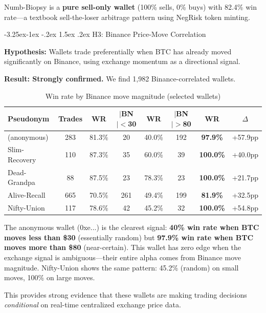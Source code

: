 \documentclass[11pt,a4paper]{article}
\makeatletter
\renewcommand\subsection{\@startsection{subsection}{2}{\z@}%
  {-3.25ex\@plus -1ex \@minus -.2ex}%
  {1.5ex \@plus .2ex}%
  {\normalfont\large\bfseries}}
\makeatother
\begin{document}
Numb-Biopsy is a \textbf{pure sell-only wallet} (100\% sells, 0\% buys) with 82.4\% win rate---a textbook sell-the-loser arbitrage pattern using NegRisk token minting.

\subsection{H3: Binance Price-Move Correlation}

\textbf{Hypothesis:} Wallets trade preferentially when BTC has already moved significantly on Binance, using exchange momentum as a directional signal.

\textbf{Result: Strongly confirmed.} We find 1,982 Binance-correlated wallets.

\begin{table}[H]
\centering
\caption{Win rate by Binance move magnitude (selected wallets)}
\label{tab:binance_corr}
\small
\begin{tabular}{@{}lccccccc@{}}
\toprule
\textbf{Pseudonym} & \textbf{Trades} & \textbf{WR} & \textbf{$|$BN$|<$30} & \textbf{WR} & \textbf{$|$BN$|>$80} & \textbf{WR} & \textbf{$\Delta$} \\
\midrule
(anonymous) & 283 & 81.3\% & 20 & 40.0\% & 192 & \textbf{97.9\%} & +57.9pp \\
Slim-Recovery & 110 & 87.3\% & 35 & 60.0\% & 39 & \textbf{100.0\%} & +40.0pp \\
Dead-Grandpa & 88 & 87.5\% & 23 & 78.3\% & 23 & \textbf{100.0\%} & +21.7pp \\
Alive-Recall & 665 & 70.5\% & 261 & 49.4\% & 199 & \textbf{81.9\%} & +32.5pp \\
Nifty-Union & 117 & 78.6\% & 42 & 45.2\% & 32 & \textbf{100.0\%} & +54.8pp \\
\bottomrule
\end{tabular}
\end{table}

The anonymous wallet (0xe...) is the clearest signal: \textbf{40\% win rate when BTC moves less than \$30} (essentially random) but \textbf{97.9\% win rate when BTC moves more than \$80} (near-certain). This wallet has zero edge when the exchange signal is ambiguous---their entire alpha comes from Binance move magnitude. Nifty-Union shows the same pattern: 45.2\% (random) on small moves, 100\% on large moves.

This provides strong evidence that these wallets are making trading decisions \emph{conditional} on real-time centralized exchange price data.
\end{document}
